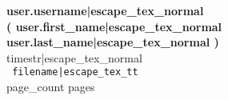 \documentclass[12pt,oneside,{{ paper_size|lower }}paper]{article}
\begin{document}
\begin{center}
\vspace*{\fill}
{\Huge \bfseries {{ user.username|escape_tex_normal }}\\[3mm]({{ user.first_name|escape_tex_normal }} {{ user.last_name|escape_tex_normal }})}\\[1cm]
{\Large {{ timestr|escape_tex_normal }} }\\[1cm]
{\Large \tt {{ filename|escape_tex_tt }} }\\[2cm]
{\large {{ page_count }} pages}
\vspace*{\fill}
\end{center}
\end{document}
